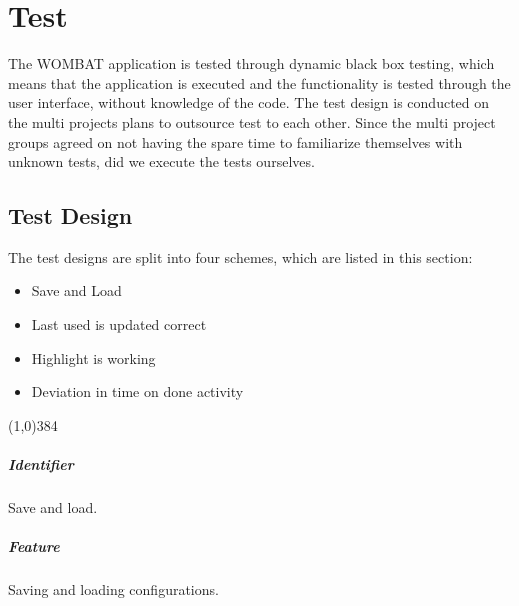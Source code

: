 \chapter{Test}
\label{cha:test}
The WOMBAT application is tested through dynamic black box testing, which means that the application is executed and the functionality is tested through the user interface, without knowledge of the code. 
The test design is conducted on the multi projects plans to outsource test to each other. 
Since the multi project groups agreed on not having the spare time to familiarize themselves with unknown tests, did we execute the tests ourselves.

\section{Test Design}
\label{sec:test_design}
The test designs are split into four schemes, which are listed in this section:
\begin{itemize}
	\item Save and Load
	\item Last used is updated correct
	\item Highlight is working
	\item Deviation in time on done activity
\end{itemize}

\pagebreak
\begin{center}
	\line(1,0){384}
\end{center}
\paragraph{Identifier}
	Save and load.
\paragraph{Feature}
	Saving and loading configurations.

